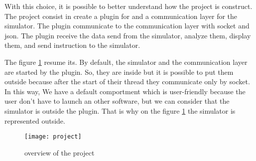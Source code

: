 With this choice, it is possible to better understand how the project is construct. The project consist in create a plugin for \umld and a communication layer for the simulator. The plugin communicate to the communication layer with socket and json. The plugin receive the data send from the simulator, analyze them, display them, and send instruction to the simulator.

The figure \ref{fig:project} resume its. By default, the simulator and the communication layer are started by the plugin. So, they are inside \umld but it is possible to put them outside because after the start of their thread they communicate only by socket. In this way, We have a default comportment which is user-friendly because the user don't have to launch an other software, but we can consider that the simulator is outside the plugin. That is why on the figure \ref{fig:project} the simulator is represented outside.

\begin{figure}[h]
  \centering
  \texttt{[image: project]}
  \caption{overview of the project}
  \label{fig:project}
\end{figure}



